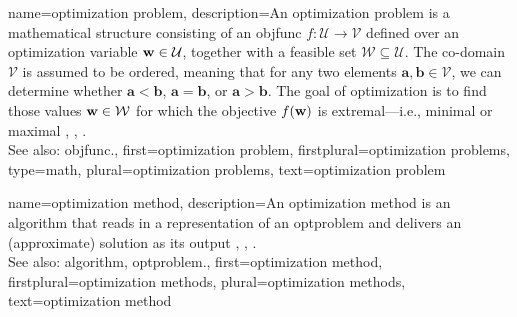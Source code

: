 {name={optimization problem}, 
	description={An optimization problem is a mathematical 
		   structure consisting of an \gls{objfunc} $f: \mathcal{U} \rightarrow \mathcal{V}$ 
		   defined over an optimization variable ${\bf w} \in \mathcal{U}$, together with a 
		   feasible set $\mathcal{W} \subseteq \mathcal{U}$. The co-domain $\mathcal{V}$ is 
		   assumed to be ordered, meaning that for any two elements $\mathbf{a}, \mathbf{b} \in \mathcal{V}$, 
		   we can determine whether $\mathbf{a} < \mathbf{b}$, $\mathbf{a} = \mathbf{b}$, 
		   or $\mathbf{a} > \mathbf{b}$. The goal of optimization is to find those values ${\bf w} \in \mathcal{W}$ 
		   for which the objective $f({\bf w})$ is extremal—i.e., minimal or maximal \cite{BoydConvexBook}, \cite{BertsekasNonLinProgr}, \cite{nesterov04}.
		   \\
		   See also: \gls{objfunc}.},
	first={optimization problem},
	firstplural={optimization problems}, 
	type=math,
	plural={optimization problems}, 
	text={optimization problem}
}

{name={optimization method},
	description={An optimization method is an \gls{algorithm} that 
		reads in a representation of an \gls{optproblem} and delivers an (approximate) solution 
		as its output \cite{BoydConvexBook}, \cite{BertsekasNonLinProgr}, \cite{nesterov04}.
		 \\
		 See also: \gls{algorithm}, \gls{optproblem}.},
	first={optimization method},
	firstplural={optimization methods}, 
	plural={optimization methods}, 
	text={optimization method}
}

